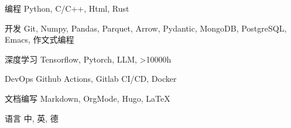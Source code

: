 \documentclass[../cv_xin_cn.tex]{subfiles}
\begin{document}


\begin{cvskills}

  \cvskill
    {编程} %
    {Python, C/C++, Html, Rust} %

  \cvskill
    {开发} %
    {Git, Numpy, Pandas, Parquet, Arrow, Pydantic, MongoDB, PostgreSQL, Emacs, 作文式编程} %

  \cvskill
    {深度学习} %
    {Tensorflow, Pytorch, LLM, >10000h} %

  \cvskill
    {DevOps} %
    {Github Actions, Gitlab CI/CD, Docker} %

  \cvskill
    {文档编写} %
    {Markdown, OrgMode, Hugo, LaTeX} %

  \cvskill
    {语言} %
    {中, 英, 德} %

\end{cvskills}
\end{document}

